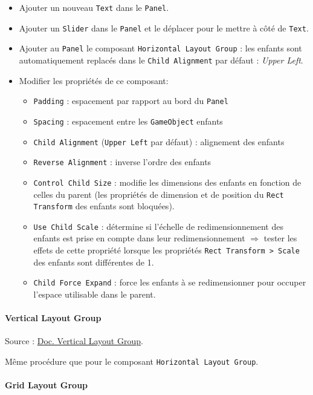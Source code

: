 \documentclass[a4paper,10pt]{article}
\newenvironment{solution}%
{\begin{tcolorbox}[breakable,colback=red!5!white,colframe=red!75!black,title=Solution]}%
{\end{tcolorbox}}
\begin{document}
\begin{enumerate}
\begin{solution}
	\begin{itemize}
		\item   Ajouter un nouveau \texttt{Text} dans le \texttt{Panel}.
		\item Ajouter un \texttt{Slider} dans le \texttt{Panel} et le déplacer pour le mettre à côté de \texttt{Text}.
		\item Ajouter au \texttt{Panel} le composant \texttt{Horizontal Layout Group} : les enfants sont automatiquement replacés dans le \texttt{Child Alignment} par défaut : \textit{Upper Left}.
		\item Modifier les propriétés de ce composant:
		\begin{itemize}
			\item \texttt{Padding} : espacement par rapport au bord du \texttt{Panel}
			\item \texttt{Spacing} : espacement entre les \texttt{GameObject} enfants
			\item \texttt{Child Alignment} (\texttt{Upper Left} par défaut) : alignement des enfants
			\item \texttt{Reverse Alignment} : inverse l'ordre des enfants
			\item \texttt{Control Child Size} : modifie les dimensions des enfants en fonction de celles du parent (les propriétés de dimension et de position du \texttt{Rect Transform} des enfants sont bloquées).
			\item \texttt{Use Child Scale} : détermine si l'échelle de redimensionnement des enfants est prise en compte dans leur redimensionnement $\Rightarrow$ tester les effets de cette propriété lorsque les propriétés \texttt{Rect Transform > Scale} des enfants sont différentes de 1.
			\item \texttt{Child Force Expand} : force les enfants à se redimensionner pour occuper l'espace utilisable dans le parent.
		\end{itemize}	
	\end{itemize}
	
\paragraph{Vertical Layout Group}

Source : \href{https://docs.unity3d.com/Packages/com.unity.ugui@1.0/manual/script-VerticalLayoutGroup.html}{Doc. Vertical Layout Group}.

Même procédure que pour le composant \texttt{Horizontal Layout Group}.

\paragraph{Grid Layout Group}


\end{solution}
\end{enumerate}
\end{document}
